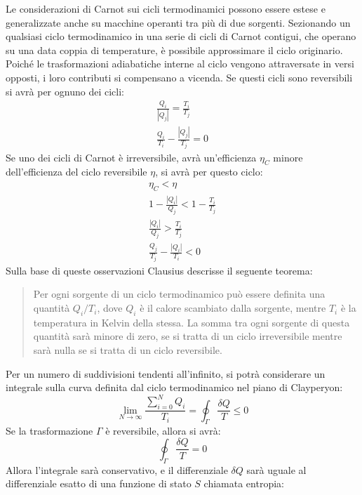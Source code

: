 \documentclass{article}
\numberwithin{equation}{subsection}
\begin{document}
Le considerazioni di Carnot sui cicli termodinamici possono essere estese e generalizzate anche su macchine operanti tra più di due sorgenti. Sezionando un qualsiasi ciclo 
termodinamico in una serie di cicli di Carnot contigui, che operano su una data coppia di temperature, è possibile approssimare il ciclo originario. Poiché le trasformazioni 
adiabatiche interne al ciclo vengono attraversate in versi opposti, i loro contributi si compensano a vicenda. 
Se questi cicli sono reversibili si avrà per ognuno dei cicli:
\begin{gather*}
    \displaystyle\frac{Q_i}{|Q_j|}=\frac{T_i}{T_j}\\
    \displaystyle\frac{Q_i}{T_i}-\frac{|Q_j|}{T_j}=0
\end{gather*}
Se uno dei cicli di Carnot è irreversibile, avrà un'efficienza $\eta_C$ minore dell'efficienza del ciclo reversibile $\eta$, si avrà per questo ciclo: 
\begin{gather*}
    \eta_C<\eta\\
    1-\displaystyle\frac{|Q_i|}{Q_j}<1-\frac{T_i}{T_j}\\
    \displaystyle\frac{|Q_i|}{Q_j}>\frac{T_i}{T_j}\\
    \displaystyle\frac{Q_j}{T_j}-\frac{|Q_i|}{T_i}<0
\end{gather*}
Sulla base di queste osservazioni Clausius descrisse il seguente teorema: 
\begin{quotation}
    Per ogni sorgente di un ciclo termodinamico può essere definita una quantità ${Q_i}/{T_i}$, dove $Q_i$ è il calore scambiato dalla sorgente, mentre $T_i$ è 
    la temperatura in Kelvin della stessa. La somma tra ogni sorgente di questa quantità sarà minore di zero, se si tratta di un 
    ciclo irreversibile mentre sarà nulla se si tratta di un ciclo reversibile. 
\end{quotation}
Per un numero di suddivisioni tendenti all'infinito, si potrà considerare un integrale sulla curva 
definita dal ciclo termodinamico nel piano di Clayperyon:
\begin{equation*}
    \lim_{N\to\infty}\displaystyle\frac{\sum_{i=0}^NQ_i}{T_i}=\oint_{\Gamma}\frac{\delta Q}{T}\leq0
\end{equation*}
Se la trasformazione $\Gamma$ è reversibile, allora si avrà:
\begin{equation*}
    \displaystyle\oint_{\Gamma}\frac{\delta Q}{T}=0
\end{equation*}    
Allora l'integrale sarà conservativo, e 
il differenziale $\delta Q$ sarà uguale al differenziale esatto di una funzione di stato $S$ chiamata entropia:
\end{document}
